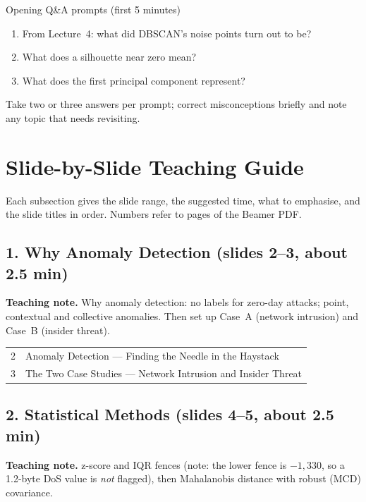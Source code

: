 \documentclass[11pt]{article}
\begin{document}
\begin{instr}{Opening Q\&A prompts (first 5 minutes)}\begin{enumerate}\item From Lecture~4: what did DBSCAN's noise points turn out to be?\item What does a silhouette near zero mean?\item What does the first principal component represent?\end{enumerate}Take two or three answers per prompt; correct misconceptions briefly and note any topic that needs revisiting.\end{instr}

\section{Slide-by-Slide Teaching Guide}

Each subsection gives the slide range, the suggested time, what to emphasise, and the slide titles in order. Numbers refer to pages of the Beamer PDF.

\subsection{1. Why Anomaly Detection \normalfont\small\color{GreyN}(slides 2--3, about 2.5 min)}

\textbf{Teaching note.} Why anomaly detection: no labels for zero-day attacks; point, contextual and collective anomalies. Then set up Case~A (network intrusion) and Case~B (insider threat).

\begin{center}\small\renewcommand{\arraystretch}{1.1}\begin{tabularx}{\textwidth}{@{}r X@{}}2 & Anomaly Detection --- Finding the Needle in the Haystack\\
3 & The Two Case Studies --- Network Intrusion and Insider Threat\\\end{tabularx}\end{center}

\subsection{2. Statistical Methods \normalfont\small\color{GreyN}(slides 4--5, about 2.5 min)}

\textbf{Teaching note.} z-score and IQR fences (note: the lower fence is $-1{,}330$, so a 1.2-byte DoS value is \emph{not} flagged), then Mahalanobis distance with robust (MCD) covariance.
\end{document}
